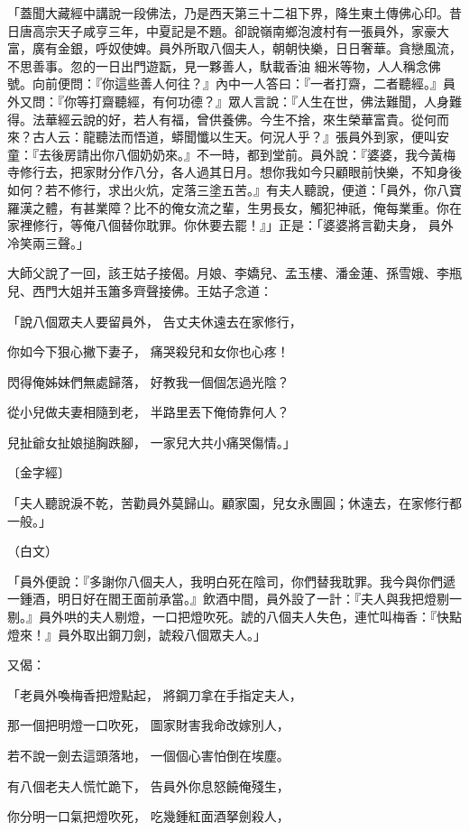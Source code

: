 「蓋聞大藏經中講說一段佛法，乃是西天第三十二祖下界，降生東土傳佛心印。昔日唐高宗天子咸亨三年，中夏記是不題。卻說嶺南鄉泡渡村有一張員外，家豪大富，廣有金銀，呼奴使婢。員外所取八個夫人，朝朝快樂，日日奢華。貪戀風流，不思善事。忽的一日出門遊翫，見一夥善人，馱載香油 細米等物，人人稱念佛號。向前便問：『你這些善人何往？』內中一人答曰：『一者打齋，二者聽經。』員外又問：『你等打齋聽經，有何功德？』眾人言說：『人生在世，佛法難聞，人身難得。法華經云說的好，若人有福，曾供養佛。今生不捨，來生榮華富貴。從何而來？古人云：龍聽法而悟道，蟒聞懺以生天。何況人乎？』張員外到家，便叫安童：『去後房請出你八個奶奶來。』不一時，都到堂前。員外說：『婆婆，我今黃梅寺修行去，把家財分作八分，各人過其日月。想你我如今只顧眼前快樂，不知身後如何？若不修行，求出火炕，定落三塗五苦。』有夫人聽說，便道：「員外，你八寶羅漢之體，有甚業障？比不的俺女流之輩，生男長女，觸犯神祇，俺每業重。你在家裡修行，等俺八個替你耽罪。你休要去罷！』」正是：「婆婆將言勸夫身，  員外冷笑兩三聲。」

大師父說了一回，該王姑子接偈。月娘、李嬌兒、孟玉樓、潘金蓮、孫雪娥、李瓶兒、西門大姐并玉簫多齊聲接佛。王姑子念道：

「說八個眾夫人要留員外，  告丈夫休遠去在家修行，

你如今下狠心撇下妻子，  痛哭殺兒和女你也心疼！

閃得俺姊妹們無處歸落，  好教我一個個怎過光陰？

從小兒做夫妻相隨到老，  半路里丟下俺倚靠何人？

兒扯爺女扯娘搥胸跌腳，  一家兒大共小痛哭傷情。」

〔金字經〕

「夫人聽說淚不乾，苦勸員外莫歸山。顧家園，兒女永團圓；休遠去，在家修行都一般。」

（白文）

「員外便說：『多謝你八個夫人，我明白死在陰司，你們替我耽罪。我今與你們遞一鍾酒，明日好在閻王面前承當。』飲酒中間，員外設了一計：『夫人與我把燈剔一剔。』員外哄的夫人剔燈，一口把燈吹死。諕的八個夫人失色，連忙叫梅香：『快點燈來！』員外取出鋼刀劍，諕殺八個眾夫人。」

又偈：

「老員外喚梅香把燈點起，  將鋼刀拿在手指定夫人，

那一個把明燈一口吹死，  圖家財害我命改嫁別人，

若不說一劍去這頭落地，  一個個心害怕倒在埃塵。

有八個老夫人慌忙跪下，  告員外你息怒饒俺殘生，

你分明一口氣把燈吹死，  吃幾鍾紅面酒拏劍殺人，

